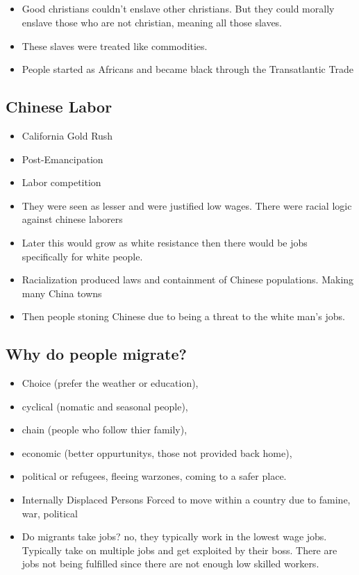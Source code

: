 \documentclass{article}
\begin{document}
\subsection{}
\begin{itemize}
  \item Good christians couldn't enslave other christians. But they could
    morally enslave those who are not christian, meaning all those slaves.
  \item These slaves were treated like commodities.
  \item People started as Africans and became black through the 
    Transatlantic Trade
\end{itemize}

\subsection{Chinese Labor}
\begin{itemize}
  \item California Gold Rush
  \item Post-Emancipation
  \item Labor competition
  \item They were seen as lesser and were justified low wages.
    There were racial logic against chinese laborers
  \item Later this would grow as white resistance
    then there would be jobs specifically for white people.
  \item Racialization produced laws and containment of 
    Chinese populations. Making many China towns
  \item Then people stoning Chinese due to being a threat
    to the white man's jobs.
\end{itemize}

\subsection{Why do people migrate?}
\begin{itemize}
  \item Choice (prefer the weather or education), 
  \item cyclical (nomatic and seasonal people),
  \item chain (people who follow thier family),
  \item economic (better oppurtunitys, those not provided back home),
  \item political or refugees,
    fleeing warzones, coming to a safer place.
  \item Internally Displaced Persons
    Forced to move within a country due to famine, war, political
  \item Do migrants take jobs? 
    no, they typically work in the lowest wage jobs.
    Typically take on multiple jobs and get exploited by their
    boss.
    There are jobs not being fulfilled since there are not enough 
    low skilled workers.
\end{itemize}
\end{document}
